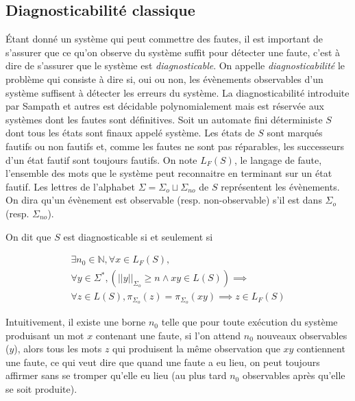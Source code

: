 \documentclass[conference]{IEEEtran}
\begin{document}
\subsection{Diagnosticabilité classique}
\'Etant donné un système qui peut commettre des fautes, il est important de s'assurer que ce qu'on observe du système suffit pour détecter une faute, c'est à dire de s'assurer que le système est \emph{diagnosticable}. On appelle \emph{diagnosticabilité} le problème qui consiste à dire si, oui ou non, les évènements observables d'un système suffisent à détecter les erreurs du système. La diagnosticabilité introduite par Sampath et autres\cite{SamSRST96} est décidable polynomialement mais est réservée aux systèmes dont les fautes sont définitives.
\newline
Soit un automate fini d\'eterministe $S$ dont tous les états sont finaux appel\'e syst\`eme. Les états de $S$ sont marqués fautifs ou non fautifs et, comme les fautes ne sont pas réparables, les successeurs d'un état fautif sont toujours fautifs. On note  $L_F(S)$, le langage de faute, l'ensemble des mots que le système peut reconnaitre en terminant sur un état fautif. Les lettres de l'alphabet $\Sigma=\Sigma_o\sqcup \Sigma_{no}$ de $S$ représentent les évènements. On dira qu'un \'ev\`enement est observable (resp. non-observable) s'il est dans $\Sigma_o$ (resp. $\Sigma_{no}$).

On dit que $S$ est diagnosticable si et seulement si

$$\begin{array}{l}
\exists n_0 \in \mathbb N, \forall x \in L_F(S),\\
\forall y \in \Sigma^*, \left(||y||_{\Sigma_o} \ge n \land xy \in  L(S)\right) \implies\\
\forall z \in L(S), \pi_{\Sigma_o}(z)=\pi_{\Sigma_o}(xy) \implies z \in L_F(S)
\end{array}$$

Intuitivement, il existe une borne $n_0$ telle que pour toute ex\'ecution du système produisant un mot $x$ contenant une faute, si l'on attend $n_0$ nouveaux observables ($y$), alors tous les mots $z$ qui produisent la m\^eme observation que $xy$ contiennent une faute, ce qui veut dire que quand une faute a eu lieu, on peut toujours affirmer sans se tromper qu'elle eu lieu (au plus tard $n_0$ observables après qu'elle se soit produite).


\end{document}
